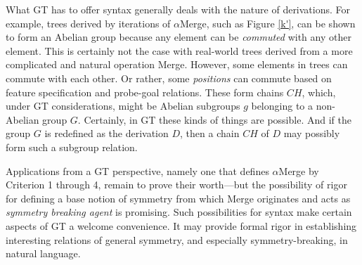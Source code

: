 \documentclass[11pt,twoside]{article}
\theoremstyle{plain}
\numberwithin{equation}{section}
\theoremstyle{definition}
\newtheorem{phrase string}{Phrase String}
\begin{document}
What GT has to offer syntax generally deals with the nature of derivations. For example, trees derived by iterations of $\alpha$Merge, such as Figure \ref{k'}, can be shown to form an Abelian group because any element can be \textsl{commuted} with any other element. This is certainly not the case with real-world trees derived from a more complicated and natural operation Merge. However, some elements in trees can commute with each other. Or rather, some \textsl{positions} can commute based on feature specification and probe-goal relations. These form chains $CH$, which, under GT considerations, might be Abelian subgroups $g$ belonging to a non-Abelian group $G$. Certainly, in GT these kinds of things are possible. And if the group $G$ is redefined as the derivation $D$, then a chain $CH$ of $D$ may possibly form such a subgroup relation.

Applications from a GT perspective, namely one that defines $\alpha$Merge by Criterion 1 through 4, remain to prove their worth---but the possibility of rigor for defining a base notion of symmetry from which Merge originates and acts as \textsl{symmetry breaking agent} is promising. Such possibilities for syntax make certain aspects of GT a welcome convenience. It may provide formal rigor in establishing interesting relations of general symmetry, and especially symmetry-breaking, in natural language.

\end{document}
